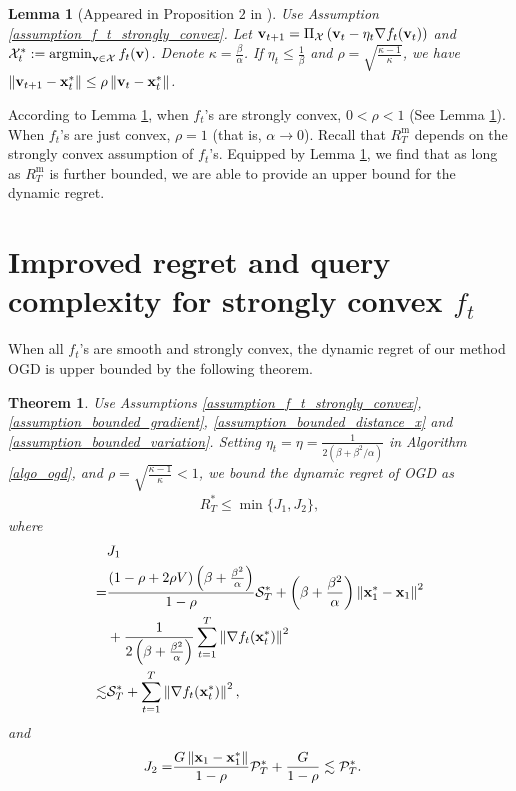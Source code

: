 \documentclass[journal]{IEEEtran}
\newtheorem{Theorem}{\bf{Theorem}}
\newtheorem{Lemma}{\bf{Lemma}}
\begin{document}
\begin{Lemma}[Appeared in Proposition $2$ in \cite{Mokhtari:2016jz}]
\label{lemma_linear_x}
Use Assumption \ref{assumption_f_t_strongly_convex}. Let ${\bf v}_{t+1} = \Pi_{{\mathcal{X}}} \left( {\bf v}_t - \eta_t \nabla f_t({\bf v}_t) \right)$ and $\Xcal_t^{\ast} := \argmin_{\v\in\Xcal} f_t(\v)$. Denote $\kappa = \frac{\beta}{\alpha}$. If $\eta_t \le \frac{1}{\beta}$ and $\rho = \sqrt{\frac{\kappa - 1}{\kappa}}$, we have $\left\lVert{\bf v}_{t+1} - {\bf x}_t^{\ast} \right\rVert    \le  \rho    \left\lVert{\bf v}_t - {\bf x}_t^{\ast} \right\rVert$.
\end{Lemma} According to Lemma \ref{lemma_linear_x}, when $f_t$'s are strongly convex, $0< \rho< 1 $ (See  Lemma \ref{lemma_linear_x}). When $f_t$'s are just convex, $\rho = 1$ (that is, $\alpha \rightarrow 0$). Recall that $R^{\mathrm{m}}_T$ depends on the strongly convex assumption of $f_t$'s. Equipped by Lemma \ref{lemma_linear_x},  we find that as long as $R^{\mathrm{m}}_T$ is further bounded, we are able to provide an upper bound for the dynamic regret.


\section{Improved regret and query complexity for strongly convex $f_t$} 
\label{sect_dynamic_regret_strongly_convex}


When all $f_t$'s are smooth and strongly convex, the dynamic regret of our method OGD is upper bounded by the following theorem.
\begin{Theorem}
\label{theorem_s_sc_regret}
Use Assumptions \ref{assumption_f_t_strongly_convex}, \ref{assumption_bounded_gradient}, \ref{assumption_bounded_distance_x} and \ref{assumption_bounded_variation}. Setting  $\eta_t = \eta = \frac{1}{2(\beta+\beta^2/\alpha)}$ in Algorithm \ref{algo_ogd}, and $\rho = \sqrt{\frac{\kappa - 1}{\kappa}} < 1$, we bound the dynamic regret of OGD as
\begin{align}
\nonumber     
R_T^{\ast} \le \min \{J_1, J_2\}, 
\end{align} where 
\begin{align}
\nonumber
& J_1 \\ \nonumber 
= & \frac{(1-\rho + 2\rho V)\left(  \beta + \frac{\beta^2}{\alpha}  \right)}{1-\rho} {\mathcal{S}}_T^{\ast}   + \left(  \beta + \frac{\beta^2}{\alpha}  \right)\left\lVert{\bf x}_1^{\ast} - {\bf x}_1\right\rVert^2   \\ \nonumber 
& + \frac{1}{ 2\left(  \beta + \frac{\beta^2}{\alpha}  \right) }\sum\limits_{t=1}^{T} \left\lVert\nabla f_t({\bf x}_t^{\ast})\right\rVert^2 \\ \nonumber
\lesssim & {\mathcal{S}}_T^{\ast} + \sum\limits_{t=1}^{T} \left\lVert\nabla f_t({\bf x}_t^{\ast})\right\rVert^2,
\end{align} and 
\begin{align}
\nonumber
J_2 = & \frac{G\left\lVert{\bf x}_1-{\bf x}_1^{\ast}\right\rVert}{1-\rho} {\mathcal{P}}_T^{\ast} + \frac{G}{1-\rho} \lesssim {\mathcal{P}}_T^{\ast}.
\end{align}

\end{Theorem} 
\end{document}
